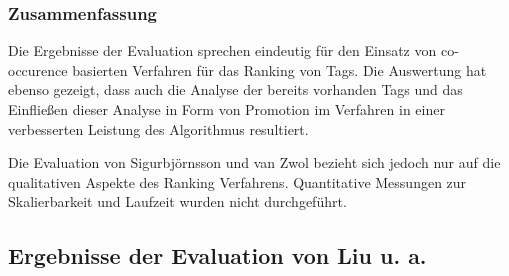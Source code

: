 
\subsubsection*{Zusammenfassung} %
\label{ssub:zusammenfassung}
Die Ergebnisse der Evaluation sprechen eindeutig für den Einsatz von co-occurence basierten Verfahren für das Ranking von Tags. Die Auswertung hat ebenso gezeigt, dass auch die Analyse der bereits vorhanden Tags und das Einfließen dieser Analyse in Form von Promotion im Verfahren in einer verbesserten Leistung des Algorithmus resultiert.

Die Evaluation von Sigurbjörnsson und van Zwol bezieht sich jedoch nur auf die qualitativen Aspekte des Ranking Verfahrens. Quantitative Messungen zur Skalierbarkeit und Laufzeit wurden nicht durchgeführt. 


\subsection{Ergebnisse der Evaluation von Liu u. a.} %
\label{sub:ergebnisse_der_evaluation_von_}


